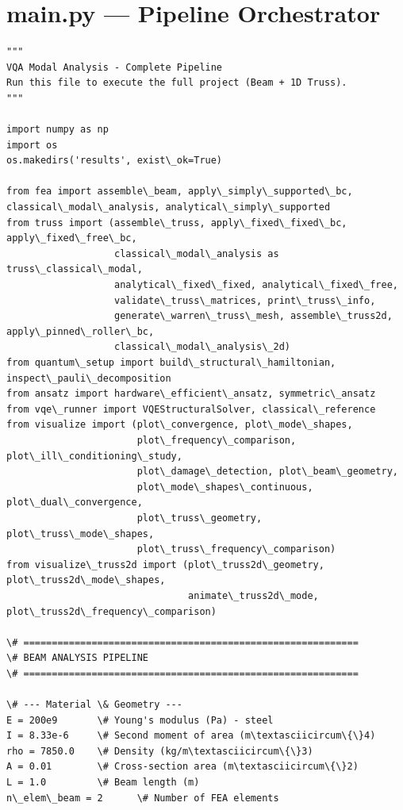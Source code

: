 \documentclass[12pt, a4paper]{article}
\begin{document}
\section{main.py --- Pipeline Orchestrator}
\begin{lstlisting}[style=codestyle, caption={{main.py --- Pipeline Orchestrator}}]
"""
VQA Modal Analysis - Complete Pipeline
Run this file to execute the full project (Beam + 1D Truss).
"""

import numpy as np
import os
os.makedirs('results', exist\_ok=True)

from fea import assemble\_beam, apply\_simply\_supported\_bc, classical\_modal\_analysis, analytical\_simply\_supported
from truss import (assemble\_truss, apply\_fixed\_fixed\_bc, apply\_fixed\_free\_bc,
                   classical\_modal\_analysis as truss\_classical\_modal,
                   analytical\_fixed\_fixed, analytical\_fixed\_free,
                   validate\_truss\_matrices, print\_truss\_info,
                   generate\_warren\_truss\_mesh, assemble\_truss2d, apply\_pinned\_roller\_bc,
                   classical\_modal\_analysis\_2d)
from quantum\_setup import build\_structural\_hamiltonian, inspect\_pauli\_decomposition
from ansatz import hardware\_efficient\_ansatz, symmetric\_ansatz
from vqe\_runner import VQEStructuralSolver, classical\_reference
from visualize import (plot\_convergence, plot\_mode\_shapes,
                       plot\_frequency\_comparison, plot\_ill\_conditioning\_study,
                       plot\_damage\_detection, plot\_beam\_geometry,
                       plot\_mode\_shapes\_continuous, plot\_dual\_convergence,
                       plot\_truss\_geometry, plot\_truss\_mode\_shapes,
                       plot\_truss\_frequency\_comparison)
from visualize\_truss2d import (plot\_truss2d\_geometry, plot\_truss2d\_mode\_shapes,
                                animate\_truss2d\_mode, plot\_truss2d\_frequency\_comparison)

\# ===========================================================
\# BEAM ANALYSIS PIPELINE
\# ===========================================================

\# --- Material \& Geometry ---
E = 200e9       \# Young's modulus (Pa) - steel
I = 8.33e-6     \# Second moment of area (m\textasciicircum\{\}4)
rho = 7850.0    \# Density (kg/m\textasciicircum\{\}3)
A = 0.01        \# Cross-section area (m\textasciicircum\{\}2)
L = 1.0         \# Beam length (m)
n\_elem\_beam = 2      \# Number of FEA elements


\end{lstlisting}
\end{document}

